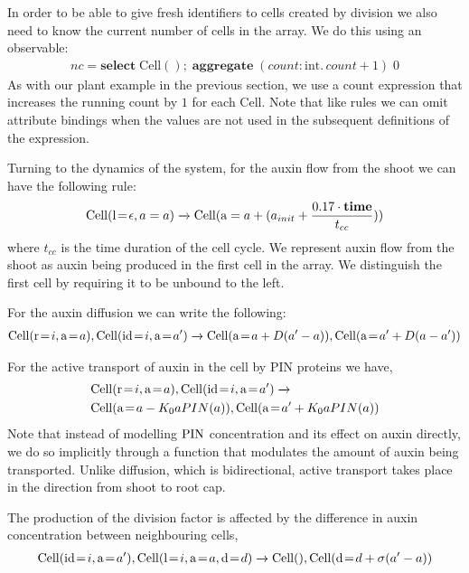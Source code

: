 In order to be able to give fresh identifiers to cells created by division we
also need to know the current number of cells in the array. We do this using
an observable:
\begin{align*}
nc = \mathbf{select} \; \mathrm{Cell}()\mathbf{;} \;\mathbf{aggregate} \; (count: \mathrm{int}.\, count + 1) \; 0
\end{align*}
As with our plant example in the previous section, we use a $\mathrm{count}$
expression that increases the running count by $1$ for each
$\mathrm{Cell}$. Note that like rules we can omit attribute bindings when the
values are not used in the subsequent definitions of the expression.

Turning to the dynamics of the system, for the auxin flow from the shoot we can
have the following rule:
\begin{align*}
\mathrm{Cell}(\mathrm{l} \!=\! \epsilon, a=a) \xrightarrow{} \mathrm{Cell}(\mathrm{a}=a + (a_{init} + \frac{0.17 \cdot \mathbf{time}}{t_{cc}}))
\end{align*}
where $t_{cc}$ is the time duration of the cell cycle. We represent auxin flow
from the shoot as auxin being produced in the first cell in the array. We
distinguish the first cell by requiring it to be unbound to the left. 

For the auxin diffusion we can write the following:
\begin{align*}
\mr{Cell}(\ar{r}{i}, \ar{a}{a}), \mr{Cell}(\ar{id}{i}, \ar{a}{a'})
  \xrightarrow{} \mr{Cell}(\ar{a}{a + D(a'-a)}), \mr{Cell}(\ar{a}{a' + D(a - a')})
\end{align*}

For the active transport of auxin in the cell by PIN proteins we have,
\begin{align*}
& \mr{Cell}(\ar{r}{i}, \ar{a}{a}), \mr{Cell}(\ar{id}{i}, \ar{a}{a'})
                 \xrightarrow{} \\
  &\mr{Cell}(\ar{a}{a - K_0 a PIN(a)}), \mr{Cell}(\ar{a}{a' + K_0
  a PIN(a)})
\end{align*}
Note that instead of modelling $\mathrm{PIN}$ concentration and its effect on auxin
directly, we do so implicitly through a function that modulates the
amount of auxin being transported. Unlike diffusion, which is bidirectional,
active transport takes place in the direction from shoot to root cap.

The production of the division factor is affected by the difference in auxin
concentration between neighbouring cells,
\begin{align*}
\mr{Cell}(\ar{id}{i}, \ar{a}{a'}), \mr{Cell}(\ar{l}{i}, \ar{a}{a}, \ar{d}{d})
  \xrightarrow{} \mr{Cell}(), \mr{Cell}(\ar{d}{d+\sigma(a'-a)})
\end{align*}

